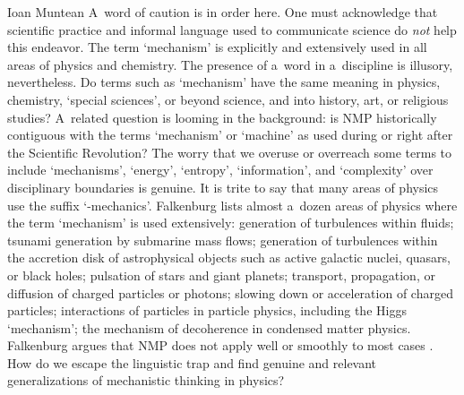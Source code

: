 \begin{recengenv}{Ioan Muntean}
A~word of caution is in order here. One must acknowledge that scientific practice and informal language used to communicate science do \textit{not} help this endeavor. The term ‘mechanism' is explicitly and extensively used in all areas of physics and chemistry. The presence of a~word in a~discipline is illusory, nevertheless. Do terms such as ‘mechanism' have the same meaning in physics, chemistry, ‘special sciences', or beyond science, and into history, art, or religious studies? A~related question is looming in the background: is NMP historically contiguous with the terms ‘mechanism' or ‘machine' as used during or right after the Scientific Revolution? The worry that we overuse or overreach some terms to include ‘mechanisms', ‘energy', ‘entropy', ‘information', and ‘complexity' over disciplinary boundaries is genuine. It is trite to say that many areas of physics use the suffix ‘-mechanics'. Falkenburg lists almost a~dozen areas of physics where the term ‘mechanism' is used extensively: generation of turbulences within fluids; tsunami generation by submarine mass flows; generation of turbulences within the accretion disk of astrophysical objects such as active galactic nuclei, quasars, or black holes; pulsation of stars and giant planets; transport, propagation, or diffusion of charged particles or photons; slowing down or acceleration of charged particles; interactions of particles in particle physics, including the Higgs ‘mechanism'; the mechanism of decoherence in condensed matter physics. Falkenburg argues that NMP does not apply well or smoothly to most cases
\parencite*[][pp.84–85]{falkenburg_mechanistic_2019}. %
 How do we escape the linguistic trap and find genuine and relevant generalizations of mechanistic thinking in physics?


\end{recengenv}
